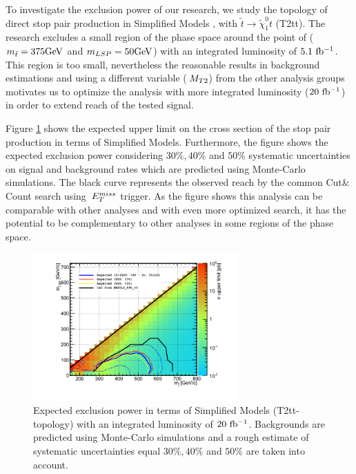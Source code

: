 To investigate the exclusion power of our research, we study the topology of direct stop pair production  in Simplified Models \cite{alves:sms}, with $\tilde{t}\to \tilde{\chi}^0_1 t$ (T2tt). The research excludes a small region of the phase space around the point of ($m_{\tilde{t}} = 375\rm{GeV}$ and $ m_{LSP} = 50\rm{GeV}$) with an integrated luminosity of $5.1\,\,\rm{fb^{-1}}$. 
This region is too small, nevertheless the reasonable results in background estimations and using a different variable ($\,{M_{T2}}$) from the other analysis groups motivates us to optimize the analysis with more integrated luminosity ($20\,\,\rm{fb^{-1}}$) in order to extend reach of the tested signal. 

Figure \ref{fig:limit_20inf} shows the expected upper limit on the cross section of the stop pair production in terms of Simplified Models. 
Furthermore, the figure shows the expected exclusion power considering $30\%, 40\%$ and $50\%$ systematic uncertainties on signal and background rates which are predicted using Monte-Carlo simulations. The black curve represents the observed reach by the common Cut$\&$Count search using $\,{E_T^{miss}}$ trigger. As the figure shows this analysis can be 
comparable with other analyses and with even more optimized search, it has the potential to be complementary to other analyses in some regions of the phase space.  

\begin{linenomath}
\begin{figure}[h]
\centering
\includegraphics[width=0.7\textwidth,keepaspectratio=true]{StatisticsFig/limit_304050sys_20inf_20130625.png}
\caption{Expected exclusion power in terms of Simplified Models (T2tt-topology) with an integrated luminosity of $20\,\,\rm{fb^{-1}}$. Backgrounds are predicted using Monte-Carlo simulations and a rough estimate of systematic uncertainties equal $30\%, 40\%$ and $50\%$ are taken into account.}
\label{fig:limit_20inf}
\end{figure}
\end{linenomath}


